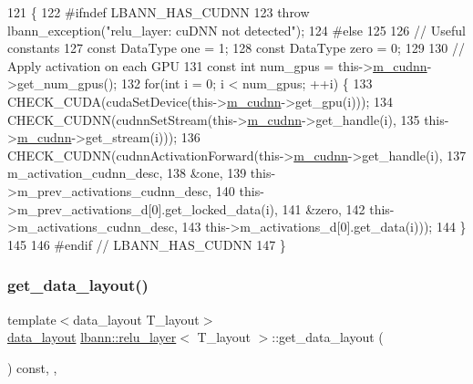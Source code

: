 \begin{DoxyCode}
121                                  \{
122 \textcolor{preprocessor}{  #ifndef LBANN\_HAS\_CUDNN}
123     \textcolor{keywordflow}{throw} lbann\_exception(\textcolor{stringliteral}{"relu\_layer: cuDNN not detected"});
124 \textcolor{preprocessor}{  #else}
125 
126     \textcolor{comment}{// Useful constants}
127     \textcolor{keyword}{const} DataType one = 1;
128     \textcolor{keyword}{const} DataType zero = 0;
129 
130     \textcolor{comment}{// Apply activation on each GPU}
131     \textcolor{keyword}{const} \textcolor{keywordtype}{int} num\_gpus = this->\hyperlink{classlbann_1_1Layer_a08dbb94239e3b8c96329786c57c72e21}{m\_cudnn}->get\_num\_gpus();
132     \textcolor{keywordflow}{for}(\textcolor{keywordtype}{int} i = 0; i < num\_gpus; ++i) \{
133       CHECK\_CUDA(cudaSetDevice(this->\hyperlink{classlbann_1_1Layer_a08dbb94239e3b8c96329786c57c72e21}{m\_cudnn}->get\_gpu(i)));
134       CHECK\_CUDNN(cudnnSetStream(this->\hyperlink{classlbann_1_1Layer_a08dbb94239e3b8c96329786c57c72e21}{m\_cudnn}->get\_handle(i),
135                                  this->\hyperlink{classlbann_1_1Layer_a08dbb94239e3b8c96329786c57c72e21}{m\_cudnn}->get\_stream(i)));
136       CHECK\_CUDNN(cudnnActivationForward(this->\hyperlink{classlbann_1_1Layer_a08dbb94239e3b8c96329786c57c72e21}{m\_cudnn}->get\_handle(i),
137                                          m\_activation\_cudnn\_desc,
138                                          &one,
139                                          this->m\_prev\_activations\_cudnn\_desc,
140                                          this->m\_prev\_activations\_d[0].get\_locked\_data(i),
141                                          &zero,
142                                          this->m\_activations\_cudnn\_desc,
143                                          this->m\_activations\_d[0].get\_data(i)));
144     \}
145 
146 \textcolor{preprocessor}{  #endif // LBANN\_HAS\_CUDNN}
147   \}
\end{DoxyCode}
\mbox{\label{classlbann_1_1relu__layer_a1d0b9cb9fc976c2c4375d9422a1ac112}} 
\subsubsection{\texorpdfstring{get\+\_\+data\+\_\+layout()}{get\_data\_layout()}}
{\footnotesize\ttfamily template$<$data\+\_\+layout T\+\_\+layout$>$ \\
\hyperlink{base_8hpp_a786677cbfb3f5677b4d84f3056eb08db}{data\+\_\+layout} \hyperlink{classlbann_1_1relu__layer}{lbann\+::relu\+\_\+layer}$<$ T\+\_\+layout $>$\+::get\+\_\+data\+\_\+layout (\begin{DoxyParamCaption}{ }\end{DoxyParamCaption}) const\hspace{0.3cm}{\ttfamily [inline]}, {\ttfamily [override]}, {\ttfamily [virtual]}}

